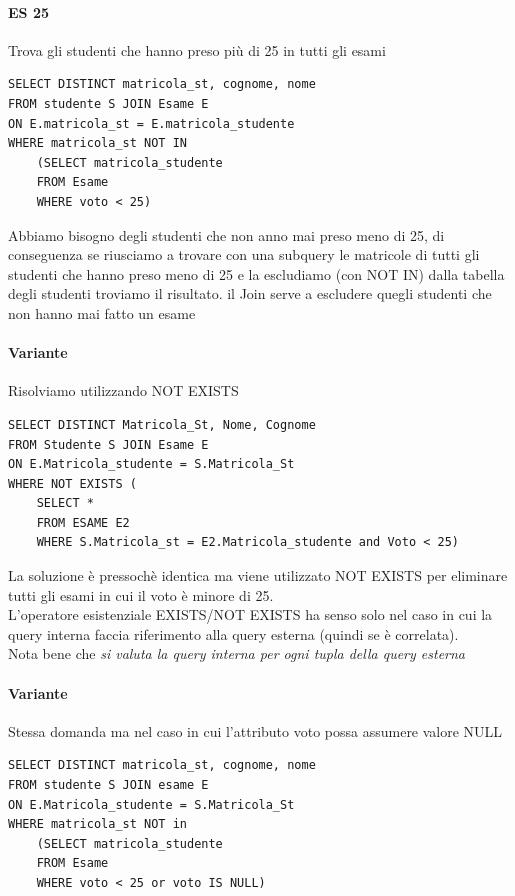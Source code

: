 \documentclass[12pt, a4paper, openany]{book}
\begin{document}
\paragraph*{ES 25}
Trova gli studenti che hanno preso più di 25 in tutti gli esami
\begin{verbatim}
SELECT DISTINCT matricola_st, cognome, nome
FROM studente S JOIN Esame E 
ON E.matricola_st = E.matricola_studente
WHERE matricola_st NOT IN 
    (SELECT matricola_studente
    FROM Esame
    WHERE voto < 25)
\end{verbatim}

Abbiamo bisogno degli studenti che non anno mai preso meno di 25, di conseguenza se riusciamo a trovare con una subquery le matricole di tutti gli studenti che hanno preso meno di 25
e la escludiamo (con NOT IN) dalla tabella degli studenti troviamo il risultato. il Join serve a escludere quegli studenti che non hanno mai fatto un esame

\paragraph{Variante}
Risolviamo utilizzando NOT EXISTS
\begin{verbatim}
SELECT DISTINCT Matricola_St, Nome, Cognome
FROM Studente S JOIN Esame E
ON E.Matricola_studente = S.Matricola_St
WHERE NOT EXISTS (
    SELECT *
    FROM ESAME E2
    WHERE S.Matricola_st = E2.Matricola_studente and Voto < 25)
\end{verbatim}

La soluzione è pressochè identica ma viene utilizzato NOT EXISTS per eliminare tutti gli esami in cui il voto è minore di 25.\\
L'operatore esistenziale EXISTS/NOT EXISTS ha senso solo nel caso in cui la query interna faccia riferimento alla query esterna (quindi se è correlata). 
\\Nota bene che \emph{si valuta la query interna per ogni tupla della query esterna}

\paragraph*{Variante}
Stessa domanda ma nel caso in cui l'attributo voto possa assumere valore NULL
\begin{verbatim}
SELECT DISTINCT matricola_st, cognome, nome
FROM studente S JOIN esame E 
ON E.Matricola_studente = S.Matricola_St
WHERE matricola_st NOT in
    (SELECT matricola_studente
    FROM Esame
    WHERE voto < 25 or voto IS NULL)
\end{verbatim}
\end{document}
